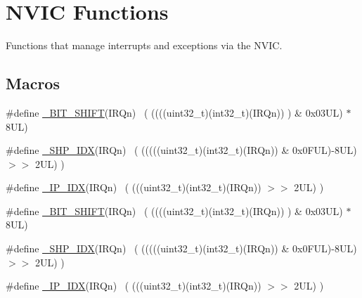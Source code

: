 \hypertarget{group___c_m_s_i_s___core___n_v_i_c_functions}{}\section{N\+V\+IC Functions}
\label{group___c_m_s_i_s___core___n_v_i_c_functions}


Functions that manage interrupts and exceptions via the N\+V\+IC.  


\subsection*{Macros}
\begin{DoxyCompactItemize}
\item 
\#define \hyperlink{group___c_m_s_i_s___core___n_v_i_c_functions_gaba07722ca082d58bec5d76ca810098b3}{\+\_\+\+B\+I\+T\+\_\+\+S\+H\+I\+FT}(I\+R\+Qn)              ~(  ((((uint32\+\_\+t)(int32\+\_\+t)(I\+R\+Qn))         )      \&  0x03\+U\+L) $\ast$ 8\+U\+L)
\item 
\#define \hyperlink{group___c_m_s_i_s___core___n_v_i_c_functions_gaff3c15c4aebdc4792ad7d7353ce83566}{\+\_\+\+S\+H\+P\+\_\+\+I\+DX}(I\+R\+Qn)                  ~( (((((uint32\+\_\+t)(int32\+\_\+t)(I\+R\+Qn)) \& 0x0\+F\+U\+L)-\/8\+U\+L) $>$$>$    2\+U\+L)      )
\item 
\#define \hyperlink{group___c_m_s_i_s___core___n_v_i_c_functions_gad2ce0bc91da29afae2feebad3a7cc014}{\+\_\+\+I\+P\+\_\+\+I\+DX}(I\+R\+Qn)                    ~(   (((uint32\+\_\+t)(int32\+\_\+t)(I\+R\+Qn))                $>$$>$    2\+U\+L)      )
\item 
\#define \hyperlink{group___c_m_s_i_s___core___n_v_i_c_functions_gaba07722ca082d58bec5d76ca810098b3}{\+\_\+\+B\+I\+T\+\_\+\+S\+H\+I\+FT}(I\+R\+Qn)              ~(  ((((uint32\+\_\+t)(int32\+\_\+t)(I\+R\+Qn))         )      \&  0x03\+U\+L) $\ast$ 8\+U\+L)
\item 
\#define \hyperlink{group___c_m_s_i_s___core___n_v_i_c_functions_gaff3c15c4aebdc4792ad7d7353ce83566}{\+\_\+\+S\+H\+P\+\_\+\+I\+DX}(I\+R\+Qn)                  ~( (((((uint32\+\_\+t)(int32\+\_\+t)(I\+R\+Qn)) \& 0x0\+F\+U\+L)-\/8\+U\+L) $>$$>$    2\+U\+L)      )
\item 
\#define \hyperlink{group___c_m_s_i_s___core___n_v_i_c_functions_gad2ce0bc91da29afae2feebad3a7cc014}{\+\_\+\+I\+P\+\_\+\+I\+DX}(I\+R\+Qn)                    ~(   (((uint32\+\_\+t)(int32\+\_\+t)(I\+R\+Qn))                $>$$>$    2\+U\+L)      )
\item 

\end{DoxyCompactItemize}
